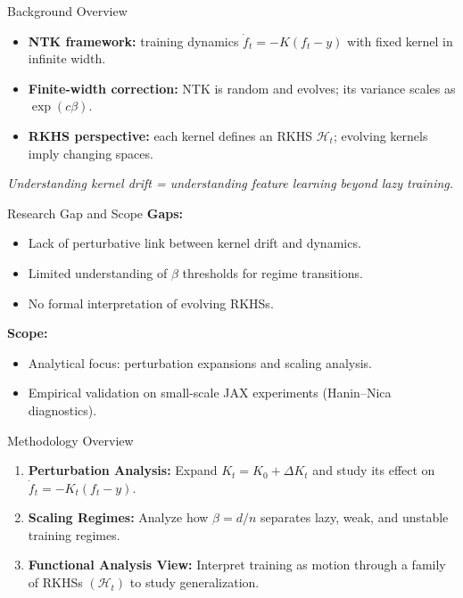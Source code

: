 \documentclass{beamer}
\begin{document}
\begin{frame}{Background Overview}
	\begin{itemize}
		\item \textbf{NTK framework:} training dynamics $\dot f_t = -K(f_t - y)$ with fixed kernel in infinite width.
		\item \textbf{Finite-width correction:} NTK is random and evolves; its variance scales as $\exp(c \beta)$.
		\item \textbf{RKHS perspective:} each kernel defines an RKHS $\mathcal H_t$; evolving kernels imply changing spaces.
	\end{itemize}
	\vfill
	\centering
	\emph{Understanding kernel drift = understanding feature learning beyond lazy training.}
\end{frame}

\begin{frame}{Research Gap and Scope}
	\textbf{Gaps:}
	\begin{itemize}
		\item Lack of perturbative link between kernel drift and dynamics.
		\item Limited understanding of $\beta$ thresholds for regime transitions.
		\item No formal interpretation of evolving RKHSs.
	\end{itemize}
	\vspace{0.8em}
	\textbf{Scope:}
	\begin{itemize}
		\item Analytical focus: perturbation expansions and scaling analysis.
		\item Empirical validation on small-scale JAX experiments (Hanin–Nica diagnostics).
	\end{itemize}
\end{frame}

\begin{frame}{Methodology Overview}
	\begin{enumerate}
		\item \textbf{Perturbation Analysis:}
		      Expand $K_t = K_0 + \Delta K_t$ and study its effect on $\dot f_t = -K_t(f_t - y)$.
		\item \textbf{Scaling Regimes:}
		      Analyze how $\beta = d/n$ separates lazy, weak, and unstable training regimes.
		\item \textbf{Functional Analysis View:}
		      Interpret training as motion through a family of RKHSs $(\mathcal H_t)$ to study generalization.
	\end{enumerate}
\end{frame}
\end{document}

